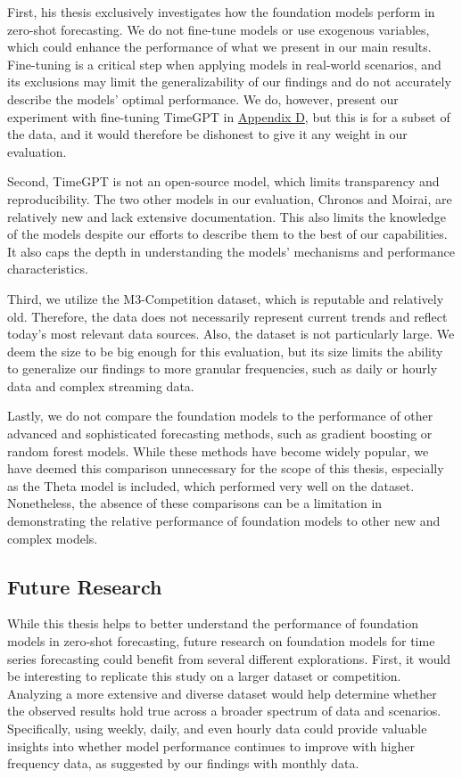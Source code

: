 \documentclass[12pt,a4paper]{article}
\begin{document}
First, his thesis exclusively investigates how the foundation models perform in zero-shot forecasting. We do not fine-tune models or use exogenous variables, which could enhance the performance of what we present in our main results. Fine-tuning is a critical step when applying models in real-world scenarios, and its exclusions may limit the generalizability of our findings and do not accurately describe the models’ optimal performance. We do, however, present our experiment with fine-tuning TimeGPT in \hyperref[appendix_d]{Appendix D}, but this is for a subset of the data, and it would therefore be dishonest to give it any weight in our evaluation. 

Second, TimeGPT is not an open-source model, which limits transparency and reproducibility. The two other models in our evaluation, Chronos and Moirai, are relatively new and lack extensive documentation. This also limits the knowledge of the models despite our efforts to describe them to the best of our capabilities. It also caps the depth in understanding the models’ mechanisms and performance characteristics. 

Third, we utilize the M3-Competition dataset, which is reputable and relatively old. Therefore, the data does not necessarily represent current trends and reflect today's most relevant data sources. Also, the dataset is not particularly large. We deem the size to be big enough for this evaluation, but its size limits the ability to generalize our findings to more granular frequencies, such as daily or hourly data and complex streaming data. 

Lastly, we do not compare the foundation models to the performance of other advanced and sophisticated forecasting methods, such as gradient boosting or random forest models. While these methods have become widely popular, we have deemed this comparison unnecessary for the scope of this thesis, especially as the Theta model is included, which performed very well on the dataset. Nonetheless, the absence of these comparisons can be a limitation in demonstrating the relative performance of foundation models to other new and complex models.  

\subsection{Future Research}

While this thesis helps to better understand the performance of foundation models in zero-shot forecasting, future research on foundation models for time series forecasting could benefit from several different explorations. First, it would be interesting to replicate this study on a larger dataset or competition. Analyzing a more extensive and diverse dataset would help determine whether the observed results hold true across a broader spectrum of data and scenarios. Specifically, using weekly, daily, and even hourly data could provide valuable insights into whether model performance continues to improve with higher frequency data, as suggested by our findings with monthly data. 
\end{document}
